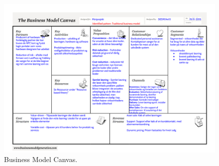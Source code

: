 \begin{figure}
  \includegraphics[angle=90, height=0.95\textheight]{graphics/BM.pdf}
  \caption{Business Model Canvas.}
  \label{bm}
\end{figure}
